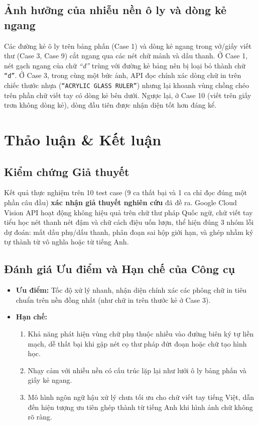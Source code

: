\documentclass[11pt,a4paper]{article}
\begin{document}
\subsection{Ảnh hưởng của nhiễu nền ô ly và dòng kẻ ngang}
Các đường kẻ ô ly trên bảng phấn (Case 1) và dòng kẻ ngang trong vở/giấy viết thư (Case 3, Case 9) cắt ngang qua các nét chữ mảnh và dấu thanh. Ở Case 1, nét gạch ngang của chữ \textit{``đ''} trùng với đường kẻ bảng nên bị loại bỏ thành chữ \texttt{``d''}. Ở Case 3, trong cùng một bức ảnh, API đọc chính xác dòng chữ in trên chiếc thước nhựa (\texttt{``ACRYLIC GLASS RULER''}) nhưng lại khoanh vùng chồng chéo trên phần chữ viết tay có dòng kẻ bên dưới. Ngược lại, ở Case 10 (viết trên giấy trơn không dòng kẻ), dòng đầu tiên được nhận diện tốt hơn đáng kể.

\section{Thảo luận \& Kết luận}

\subsection{Kiểm chứng Giả thuyết}
Kết quả thực nghiệm trên 10 test case (9 ca thất bại và 1 ca chỉ đọc đúng một phần câu đầu) \textbf{xác nhận giả thuyết nghiên cứu} đã đề ra. Google Cloud Vision API hoạt động không hiệu quả trên chữ thư pháp Quốc ngữ, chữ viết tay tiểu học nét thanh nét đậm và chữ cách điệu uốn lượn, thể hiện đúng 3 nhóm lỗi dự đoán: mất dấu phụ/dấu thanh, phân đoạn sai hộp giới hạn, và ghép nhầm ký tự thành từ vô nghĩa hoặc từ tiếng Anh.

\subsection{Đánh giá Ưu điểm và Hạn chế của Công cụ}
\begin{itemize}[label=-]
    \item \textbf{Ưu điểm:} Tốc độ xử lý nhanh, nhận diện chính xác các phông chữ in tiêu chuẩn trên nền đồng nhất (như chữ in trên thước kẻ ở Case 3).
    \item \textbf{Hạn chế:}
    \begin{enumerate}[label=(\arabic*)]
        \item Khả năng phát hiện vùng chữ phụ thuộc nhiều vào đường biên ký tự liền mạch, dễ thất bại khi gặp nét cọ thư pháp đứt đoạn hoặc chữ tạo hình học.
        \item Nhạy cảm với nhiễu nền có cấu trúc lặp lại như lưới ô ly bảng phấn và giấy kẻ ngang.
        \item Mô hình ngôn ngữ hậu xử lý chưa tối ưu cho chữ viết tay tiếng Việt, dẫn đến hiện tượng ưu tiên ghép thành từ tiếng Anh khi hình ảnh chữ không rõ ràng.
    \end{enumerate}
\end{itemize}
\end{document}
